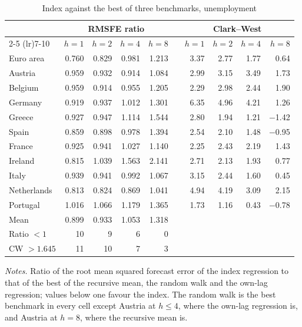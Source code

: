 \documentclass[12pt]{article}
\begin{document}
\begin{table}[htbp]
\centering
\caption{Index against the best of three benchmarks, unemployment}
\label{tab:main}
\begin{tabular}{lrrrrcrrrr}
\toprule
& \multicolumn{4}{c}{RMSFE ratio} & & \multicolumn{4}{c}{Clark--West} \\
\cmidrule(lr){2-5} \cmidrule(lr){7-10}
& $h{=}1$ & $h{=}2$ & $h{=}4$ & $h{=}8$ & & $h{=}1$ & $h{=}2$ & $h{=}4$ & $h{=}8$ \\
\midrule
Euro area   & 0.760 & 0.829 & 0.981 & 1.213 & & 3.37 & 2.77 & 1.77 & 0.64 \\
Austria     & 0.959 & 0.932 & 0.914 & 1.084 & & 2.99 & 3.15 & 3.49 & 1.73 \\
Belgium     & 0.959 & 0.914 & 0.955 & 1.205 & & 2.29 & 2.98 & 2.44 & 1.90 \\
Germany     & 0.919 & 0.937 & 1.012 & 1.301 & & 6.35 & 4.96 & 4.21 & 1.26 \\
Greece      & 0.927 & 0.947 & 1.114 & 1.544 & & 2.80 & 1.94 & 1.21 & $-$1.42 \\
Spain       & 0.859 & 0.898 & 0.978 & 1.394 & & 2.54 & 2.10 & 1.48 & $-$0.95 \\
France      & 0.925 & 0.941 & 1.027 & 1.140 & & 2.25 & 2.43 & 2.19 & 1.43 \\
Ireland     & 0.815 & 1.039 & 1.563 & 2.141 & & 2.71 & 2.13 & 1.93 & 0.77 \\
Italy       & 0.939 & 0.941 & 0.992 & 1.067 & & 3.15 & 2.44 & 1.60 & 0.45 \\
Netherlands & 0.813 & 0.824 & 0.869 & 1.041 & & 4.94 & 4.19 & 3.09 & 2.15 \\
Portugal    & 1.016 & 1.066 & 1.179 & 1.365 & & 1.73 & 1.16 & 0.43 & $-$0.78 \\
\midrule
Mean        & 0.899 & 0.933 & 1.053 & 1.318 & & & & & \\
Ratio $<1$  & 10 & 9 & 6 & 0 & & & & & \\
CW $>1.645$ & 11 & 10 & 7 & 3 & & & & & \\
\bottomrule
\end{tabular}

\vspace{0.5em}
\begin{minipage}{0.95\textwidth}
\footnotesize \textit{Notes.} Ratio of the root mean squared forecast error of
the index regression to that of the best of the recursive mean, the random walk
and the own-lag regression; values below one favour the index. The random walk
is the best benchmark in every cell except Austria at $h \le 4$, where the
own-lag regression is, and Austria at $h = 8$, where the recursive mean is.
\end{minipage}
\end{table}
\end{document}
